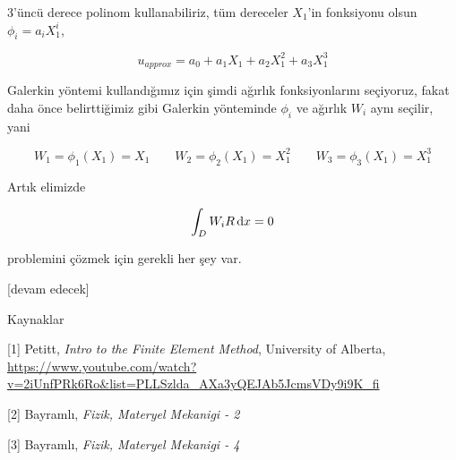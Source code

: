 \documentclass[12pt,fleqn]{article}\usepackage{../../common}
\begin{document}
3'üncü derece polinom kullanabiliriz, tüm dereceler $X_1$'in fonksiyonu olsun
$\phi_i = a_i X_1^i$, 

$$
u_{approx} = a_0 + a_1 X_1 + a_2 X_1^2 + a_3 X_1^3 
$$

Galerkin yöntemi kullandığımız için şimdi ağırlık fonksiyonlarını seçiyoruz,
fakat daha önce belirttiğimiz gibi Galerkin yönteminde $\phi_i$ ve ağırlık $W_i$
aynı seçilir, yani

$$
W_1 = \phi_1(X_1) = X_1 \qquad 
W_2 = \phi_2(X_1) = X_1^2 \qquad 
W_3 = \phi_3(X_1) = X_1^3
$$

Artık elimizde 

$$
\int_D W_i R \,\mathrm{d} x = 0
$$

problemini çözmek için gerekli her şey var.



[devam edecek]

Kaynaklar

[1] Petitt, {\em Intro to the Finite Element Method}, University of Alberta,
    \url{https://www.youtube.com/watch?v=2iUnfPRk6Ro&list=PLLSzlda_AXa3yQEJAb5JcmsVDy9i9K_fi}

[2] Bayramlı, {\em Fizik, Materyel Mekanigi - 2}
    
[3] Bayramlı, {\em Fizik, Materyel Mekanigi - 4}
    
\end{document}
